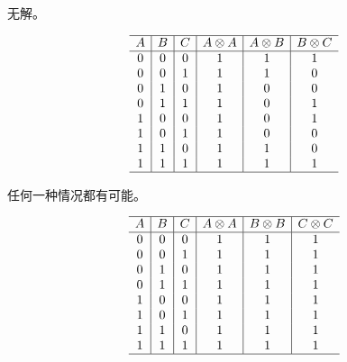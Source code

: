 {{        %
        \begin{practices}
            无解。

            \begin{table}[H]
                \[
                    \begin{array}{c|c|c|c|c|c}
                        \hline
                        A & B & C & A \otimes A & A \otimes B & B \otimes C \\
                        \hline
                        0 & 0 & 0 & 1 & 1 & 1 \\
                        0 & 0 & 1 & 1 & 1 & 0 \\
                        0 & 1 & 0 & 1 & 0 & 0 \\
                        0 & 1 & 1 & 1 & 0 & 1 \\
                        1 & 0 & 0 & 1 & 0 & 1 \\
                        1 & 0 & 1 & 1 & 0 & 0 \\
                        1 & 1 & 0 & 1 & 1 & 0 \\
                        1 & 1 & 1 & 1 & 1 & 1 \\
                        \hline
                   \end{array}
               \]
            \end{table}
        \end{practices}

        \begin{practices}
            任何一种情况都有可能。

            \begin{table}[H]
                \[
                    \begin{array}{c|c|c|c|c|c}
                        \hline
                        A & B & C & A \otimes A & B \otimes B & C \otimes C \\
                        \hline
                        0 & 0 & 0 & 1 & 1 & 1 \\
                        0 & 0 & 1 & 1 & 1 & 1 \\
                        0 & 1 & 0 & 1 & 1 & 1 \\
                        0 & 1 & 1 & 1 & 1 & 1 \\
                        1 & 0 & 0 & 1 & 1 & 1 \\
                        1 & 0 & 1 & 1 & 1 & 1 \\
                        1 & 1 & 0 & 1 & 1 & 1 \\
                        1 & 1 & 1 & 1 & 1 & 1 \\
                        \hline
                   \end{array}
               \]
            \end{table}
        \end{practices}

}}
